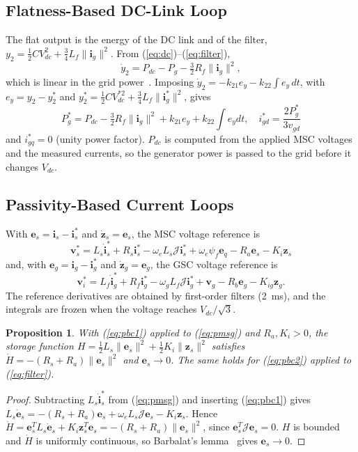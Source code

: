 \documentclass[conference]{IEEEtran}
\newtheorem{proposition}{Proposition}
\newcommand{\bv}[1]{\mathbf{#1}}
\newcommand{\Jm}{\boldsymbol{\mathcal{J}}}
\begin{document}
\subsection{Flatness-Based DC-Link Loop}
The flat output is the energy of the DC link and of the filter,
$y_2=\frac12CV_{dc}^2+\frac34L_f\|\bv{i}_g\|^2$. From (\ref{eq:dc})--(\ref{eq:filter}),
\begin{equation}
\dot y_2 = P_{dc} - P_g - \tfrac32R_f\|\bv{i}_g\|^2 ,
\label{eq:y2}
\end{equation}
which is linear in the grid power~\cite{thounthong2010}. Imposing $\dot y_2=-k_{21}e_y-k_{22}\int e_y\,dt$,
with $e_y=y_2-y_2^*$ and $y_2^*=\frac12CV_{dc}^{*2}+\frac34L_f\|\bv{i}_g^*\|^2$, gives
\begin{equation}
P_g^* = P_{dc} - \tfrac32R_f\|\bv{i}_g\|^2 + k_{21}e_y + k_{22}\!\int\! e_y dt,\quad
i_{gd}^*=\frac{2P_g^*}{3v_{gd}}
\label{eq:flat2}
\end{equation}
and $i_{gq}^*=0$ (unity power factor). $P_{dc}$ is computed from the applied MSC voltages and the measured
currents, so the generator power is passed to the grid before it changes $V_{dc}$.

\subsection{Passivity-Based Current Loops}
With $\bv{e}_s=\bv{i}_s-\bv{i}_s^*$ and $\dot{\bv{z}}_s=\bv{e}_s$, the MSC voltage reference is
\begin{equation}
\bv{v}_s^* = L_s\dot{\bv{i}}_s^* + R_s\bv{i}_s^* - \omega_eL_s\Jm\bv{i}_s^* + \omega_e\psi_f\bv{e}_q
- R_a\bv{e}_s - K_i\bv{z}_s
\label{eq:pbc1}
\end{equation}
and, with $\bv{e}_g=\bv{i}_g-\bv{i}_g^*$ and $\dot{\bv{z}}_g=\bv{e}_g$, the GSC voltage reference is
\begin{equation}
\bv{v}_i^* = L_f\dot{\bv{i}}_g^* + R_f\bv{i}_g^* - \omega_gL_f\Jm\bv{i}_g^* + \bv{v}_g
- R_b\bv{e}_g - K_{ig}\bv{z}_g .
\label{eq:pbc2}
\end{equation}
The reference derivatives are obtained by first-order filters (2~ms), and the integrals are frozen when
the voltage reaches $V_{dc}/\sqrt3$.

\begin{proposition}
With (\ref{eq:pbc1}) applied to (\ref{eq:pmsg}) and $R_a,K_i>0$, the storage function
$H=\frac12L_s\|\bv{e}_s\|^2+\frac12K_i\|\bv{z}_s\|^2$ satisfies $\dot H=-(R_s+R_a)\|\bv{e}_s\|^2$ and
$\bv{e}_s\to0$. The same holds for (\ref{eq:pbc2}) applied to (\ref{eq:filter}).
\end{proposition}
\begin{proof}
Subtracting $L_s\dot{\bv{i}}_s^*$ from (\ref{eq:pmsg}) and inserting (\ref{eq:pbc1}) gives
$L_s\dot{\bv{e}}_s=-(R_s+R_a)\bv{e}_s+\omega_eL_s\Jm\bv{e}_s-K_i\bv{z}_s$. Hence
$\dot H=\bv{e}_s^TL_s\dot{\bv{e}}_s+K_i\bv{z}_s^T\bv{e}_s=-(R_s+R_a)\|\bv{e}_s\|^2$, since
$\bv{e}_s^T\Jm\bv{e}_s=0$. $H$ is bounded and $\dot H$ is uniformly continuous, so Barbalat's
lemma~\cite{khalil2002} gives $\bv{e}_s\to0$.
\end{proof}
\end{document}
